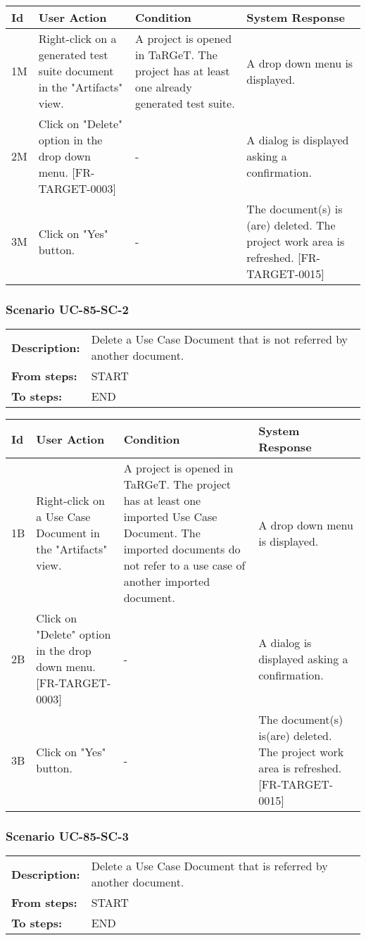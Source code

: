 \documentclass[a4paper,11pt]{article}
\newcommand{\bl}{\\ \hline}
\begin{document}
\begin{tabular}{|p{0.8in}|p{1.6in}|p{1.6in}|p{1.6in}|}
\hline
Id & User Action & Condition & System Response  \bl 
1M & Right-click on a generated test suite document in the "Artifacts" view. & A project is opened in TaRGeT. The project has at least one already generated test suite. & A drop down menu is displayed. \bl 
2M & Click on "Delete" option in the drop down menu. [FR-TARGET-0003] & - & A dialog is displayed asking a confirmation. \bl 
3M & Click on "Yes" button. & - & The document(s) is (are) deleted. The project work area is refreshed. [FR-TARGET-0015] \bl 
\end{tabular}
\subsubsection*{Scenario UC-85-SC-2}
\begin{tabular}{p{1in}p{4in}}
{\bf Description:} & Delete a Use Case Document that is not referred by another document. \\
{\bf From steps:} & START \\
{\bf To steps:} & END \\
\end{tabular}
 
\begin{tabular}{|p{0.8in}|p{1.6in}|p{1.6in}|p{1.6in}|}
\hline
Id & User Action & Condition & System Response  \bl 
1B & Right-click on a Use Case Document in the "Artifacts" view. & A project is opened in TaRGeT. The project has at least one imported Use Case Document. The imported documents do not refer to a use case of another imported document. & A drop down menu is displayed. \bl 
2B & Click on "Delete" option in the drop down menu. [FR-TARGET-0003] & - & A dialog is displayed asking a confirmation. \bl 
3B & Click on "Yes" button. & - & The document(s) is(are) deleted. The project work area is refreshed. [FR-TARGET-0015] \bl 
\end{tabular}
\subsubsection*{Scenario UC-85-SC-3}
\begin{tabular}{p{1in}p{4in}}
{\bf Description:} & Delete a Use Case Document that is referred by another document. \\
{\bf From steps:} & START \\
{\bf To steps:} & END \\
\end{tabular}
 
\end{document}
